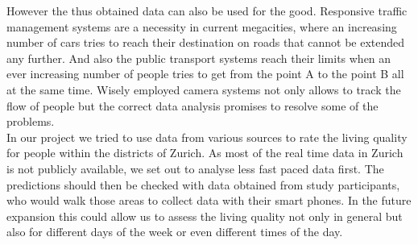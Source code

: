 \documentclass[letterpaper]{article}
\begin{document}
\indent However the thus obtained data can also be used for the good. Responsive traffic management systems are a necessity in current
megacities, where an increasing number of cars tries to reach their destination on roads that cannot be extended any further.
And also the public transport systems reach their limits when an ever increasing number of people tries to get from the point A to the point B
all at the same time. Wisely employed camera systems not only allows to track the flow of people but the correct data analysis promises to resolve
some of the problems.\\
\indent In our project we tried to use data from various sources to rate the living quality for people within the districts of Zurich.
As most of the real time data in Zurich is not publicly available, we set out to analyse less fast paced data first. The predictions
should then be checked with data obtained from study participants, who would walk those areas to collect data with their smart phones.
In the future expansion this could allow us to assess the living quality not only in general but also for different days of the week or even
different times of the day.
\end{document}
